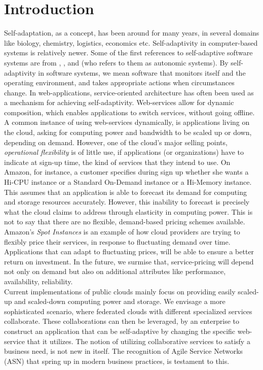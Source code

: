 \documentclass[10pt,journal,compsoc]{IEEEtran}
\begin{document}
\section{Introduction}
Self-adaptation, as a concept, has been around for many years, in several domains like biology, chemistry, logistics, economics etc. Self-adaptivity in computer-based systems is relatively newer. Some of the first references to self-adaptive software systems are from \cite{Oreizy1998Architecture-based}, \cite{Laddaga1999Guest}, \cite{Kokar1999Control} and \cite{Kephart2003Vision} (who refers to them as autonomic systems). By self-adaptivity in software systems, we mean software that monitors itself and the operating environment, and takes appropriate actions when circumstances change. In web-applications, service-oriented architecture has often been used as a mechanism for achieving self-adaptivity\cite{DiNitto2008journey}. Web-services allow for dynamic composition, which enables applications to switch services, without going offline. A common instance of using web-services dynamically, is applications living on the cloud, asking for computing power and bandwidth to be scaled up or down, depending on demand. However, one of the cloud's major selling points, \textit{operational flexibility} is of little use, if applications (or organizations) have to indicate at sign-up time, the kind of services that they intend to use. On Amazon, for instance, a customer specifies during sign up whether she wants a Hi-CPU instance or a Standard On-Demand instance or a Hi-Memory instance. This assumes that an application is able to forecast its demand for computing and storage resources accurately. However, this inability to forecast is precisely what the cloud claims to address through elasticity in computing power. This is not to say that there are no flexible, demand-based pricing schemes available. Amazon's \textit{Spot Instances} \cite{Amazon2010SpotInstance} is an example of how cloud providers are trying to flexibly price their services, in response to fluctuating demand over time. Applications that can adapt to fluctuating prices, will be able to ensure a better return on investment. In the future, we surmise that, service-pricing will depend not only on demand but also on additional attributes like performance, availability, reliability.
\\ 
Current implementations of public clouds mainly focus on providing easily scaled-up and scaled-down computing power and storage. We envisage a more sophisticated scenario, where federated clouds with different specialized services collaborate. These collaborations can then be leveraged, by an enterprise to construct an application that can be self-adaptive by changing the specific web-service that it utilizes. The notion of utilizing collaborative services to satisfy a business need, is not new in itself. The recognition of Agile Service Networks (ASN) that spring up in modern business practices, is testament to this. 
\end{document}
